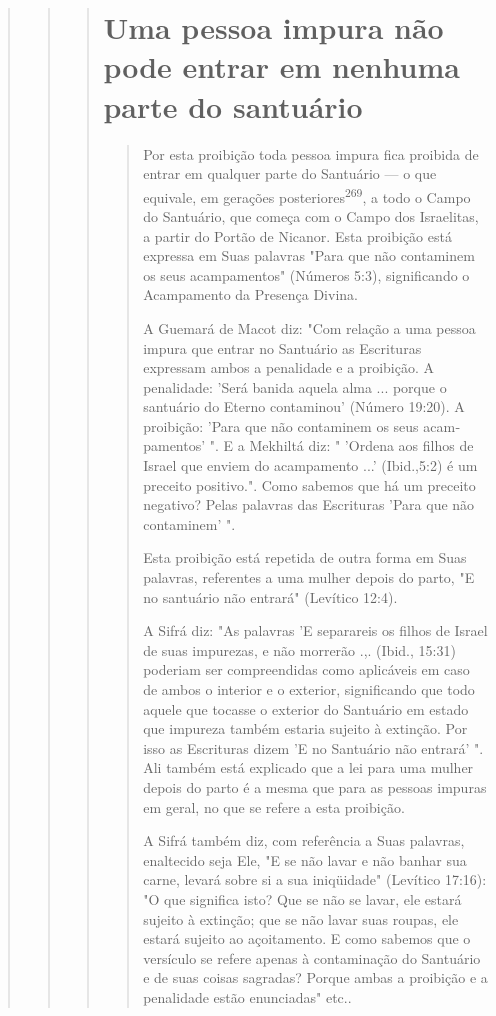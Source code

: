 \begin{quote}
\begin{quote}
\begin{quote}
\section{Uma pessoa impura não pode entrar em nenhuma parte do santuário}

\begin{quote}
Por esta proibição toda pessoa impura fica proibida de entrar em
qual­quer parte do Santuário --- o que equivale, em gerações
posteriores\textsuperscript{269}, a todo o Campo do Santuário, que
começa com o Campo dos Israelitas, a partir do Portão de Nicanor. Esta
proibição está expressa em Suas palavras "Para que não contaminem os
seus acampamentos" (Números 5:3), significando o Acampa­mento da
Presença Divina.

A Guemará de Macot diz: "Com relação a uma pessoa impura que entrar no
Santuário as Escrituras expressam ambos a penalidade e a proibição. A
penalidade: 'Será banida aquela alma ... porque o santuário do Eterno
conta­minou' (Número 19:20). A proibição: 'Para que não contaminem os
seus acam­pamentos' ". E a Mekhiltá diz: " 'Ordena aos filhos de Israel
que enviem do acampamento ...' (Ibid.,5:2) é um preceito
positivo.". Como sabemos que há um preceito negativo?
Pelas palavras das Escrituras 'Para que não contaminem' ".

Esta proibição está repetida de outra forma em Suas palavras,
refe­rentes a uma mulher depois do parto, "E no santuário não entrará"
(Levítico 12:4).

A Sifrá diz: "As palavras 'E separareis os filhos de Israel de suas
im­purezas, e não morrerão .,. (Ibid., 15:31) poderiam ser compreendidas
como aplicáveis em caso de ambos o interior e o exterior, significando
que todo aquele que tocasse o exterior do Santuário em estado que
impureza também estaria sujeito à extinção. Por isso as Escrituras dizem
'E no Santuário não entrará' ". Ali também está explicado que a lei para
uma mulher depois do parto é a mes­ma que para as pessoas impuras em
geral, no que se refere a esta proibição.

A Sifrá também diz, com referência a Suas palavras, enaltecido seja Ele,
"E se não lavar e não banhar sua carne, levará sobre si a sua
iniqüidade" (Levítico 17:16): "O que significa isto? Que se não se
lavar, ele estará sujeito à extinção; que se não lavar suas roupas, ele
estará sujeito ao açoitamento. E como sabemos que o versículo se refere
apenas à contaminação do Santuário e de suas coisas sagradas? Porque
ambas a proibição e a penalidade estão enun­ciadas" etc..


\end{quote}
\end{quote}
\end{quote}
\end{quote}
